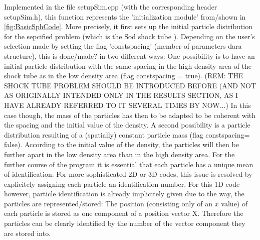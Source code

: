\documentclass{report}
\begin{document}
Implemented in the file setupSim.cpp (with the corresponding header setupSim.h), this function represents the 'initialization module' from/shown in \ref{fig:BasicSphCode}. More precisely, it first sets up the initial particle distribution for the sepcified problem (which is the Sod shock tube \cite{Sod1978}). Depending on the user's selection made by setting the flag 'constspacing' (member of parameters dara structure), this is done/made? in two different ways:
One possibility is to have an initial particle distribution with the same spacing in the high density area of the shock tube as in the low density area (flag constspacing = true). (REM: THE SHOCK TUBE PROBLEM SHOULD BE INTRODUCED BEFORE (AND NOT AS ORIGINALLY INTENDED ONLY IN THE RESULTS SECTION, AS I HAVE ALREADY REFERRED TO IT SEVERAL TIMES BY NOW...) In this case though, the mass of the particles has then to be adapted to be coherent with the spacing and the initial value of the density.
A second possibility is a particle distribution resulting of a (spatially) constant particle mass (flag constspacing= false). According to the initial value of the density, the particles will then be further apart in the low density area than in the high density area.
For the further course of the program it is essential that each particle has a unique mean of identification. For more sophisticated 2D or 3D codes, this issue is resolved by explicitely assigning each particle an identification number. For this 1D code however, particle identification is already implicitely given due to the way, the particles are represented/stored: The position (consisting only of an $x$ value) of each particle is stored as one component of a position vector X. Therefore the particles can be clearly identified by the number of the vector component they are stored into.
\end{document}
